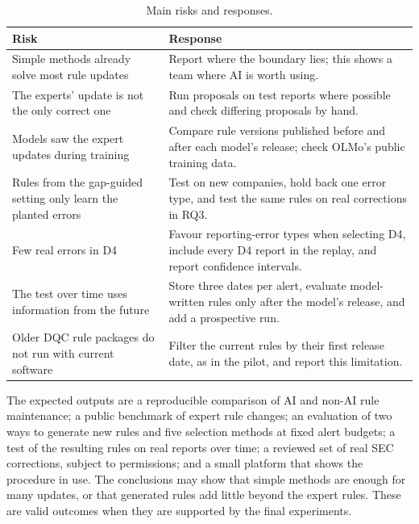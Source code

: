\documentclass[11pt,a4paper]{article}
\begin{document}
\begin{table}[htb]
\centering
\small
\begin{tabularx}{\textwidth}{L L}
\toprule
Risk & Response \\
\midrule
Simple methods already solve most rule updates & Report where the boundary lies; this shows a team where AI is worth using. \\
The experts' update is not the only correct one & Run proposals on test reports where possible and check differing proposals by hand. \\
Models saw the expert updates during training & Compare rule versions published before and after each model's release; check OLMo's public training data. \\
Rules from the gap-guided setting only learn the planted errors & Test on new companies, hold back one error type, and test the same rules on real corrections in RQ3. \\
Few real errors in D4 & Favour reporting-error types when selecting D4, include every D4 report in the replay, and report confidence intervals. \\
The test over time uses information from the future & Store three dates per alert, evaluate model-written rules only after the model's release, and add a prospective run. \\
Older DQC rule packages do not run with current software & Filter the current rules by their first release date, as in the pilot, and report this limitation. \\
\bottomrule
\end{tabularx}
\caption{Main risks and responses.}
\label{tab:risks}
\end{table}

The expected outputs are a reproducible comparison of AI and non-AI rule maintenance; a public benchmark of expert rule changes; an evaluation of two ways to generate new rules and five selection methods at fixed alert budgets; a test of the resulting rules on real reports over time; a reviewed set of real SEC corrections, subject to permissions; and a small platform that shows the procedure in use. The conclusions may show that simple methods are enough for many updates, or that generated rules add little beyond the expert rules. These are valid outcomes when they are supported by the final experiments.
\end{document}

